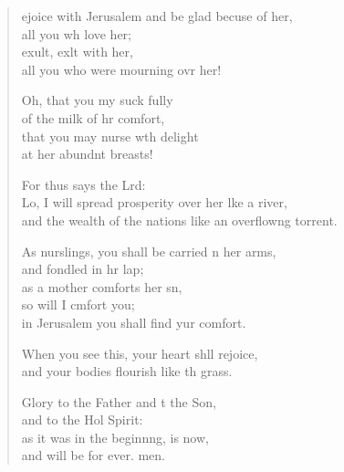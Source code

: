 \begin{verse}
  \begin{patverse}
ejoice with Jerusalem and be glad becuse of her,\Med\\
all you wh love her;\\
exult, exlt with her,\Med\\
all you who were mourning ovr her!

Oh, that you my suck fully\Med\\
of the milk of hr comfort,\\
that you may nurse wth delight\Med\\
at her abundnt breasts!

For thus says the Lrd:\Flex\\
Lo, I will spread prosperity over her lke a river,\Med\\
and the wealth of the nations like an overflow\pointup{\i}ng torrent.

As nurslings, you shall be carried n her arms,\Med\\
and fondled in hr lap;\\
as a mother comforts her sn,\Flex\\
so will I cmfort you;\Med\\
in Jerusalem you shall find yur comfort.

When you see this, your heart shll rejoice,\Med\\
and your bodies flourish like th grass.

Glory to the Father and t the Son,\Med\\
and to the Hol Spirit:\\
as it was in the beginnng, is now,\Med\\
and will be for ever. men.
  \end{patverse}
\end{verse}
